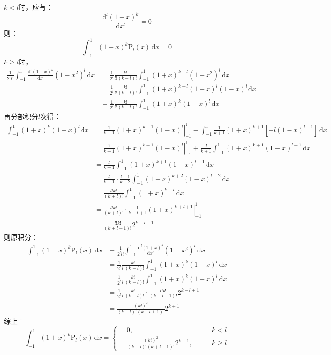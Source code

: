 \documentclass[fontset=windows]{ctexart}
\begin{document}
\begin{itemize}
    $k<l$时，应有：
    \[
        \frac{\mathrm{d}^l(1+x)^k}{\mathrm{d}x^l} = 0
    \]
    则：
    \[
        \int_{-1}^{1}(1+x)^k\mathrm{P}_l(x)\,\mathrm{d}x = 0
    \]
    $k\geqslant l$时，
    \begin{align*}
        \frac{1}{2^l l!}\int_{-1}^{1}\frac{\mathrm{d}^l(1+x)^k}{\mathrm{d}x^l}(1-x^2)^{l}\,\mathrm{d}x
        &= \frac{1}{2^l}\frac{k!}{l!(k-l)!}\int_{-1}^{1}(1+x)^{k-l}(1-x^2)^{l}\,\mathrm{d}x \\
        &= \frac{1}{2^l}\frac{k!}{l!(k-l)!}\int_{-1}^{1}(1+x)^{k-l}(1+x)^{l}(1-x)^{l}\,\mathrm{d}x \\
        &= \frac{1}{2^l}\frac{k!}{l!(k-l)!}\int_{-1}^{1}(1+x)^{k}(1-x)^{l}\,\mathrm{d}x
    \end{align*}
    再分部积分$l$次得：
    \begin{align*}
        \int_{-1}^{1}(1+x)^k(1-x)^{l}\,\mathrm{d}x
        &= \left.\frac{1}{k+1}(1+x)^{k+1}(1-x)^l\right|_{-1}^1 - \int_{-1}^{1}\frac{1}{k+1}(1+x)^{k+1}[-l(1-x)^{l-1}]\,\mathrm{d}x \\
        &= \left.\frac{1}{k+1}(1+x)^{k+1}(1-x)^l\right|_{-1}^1 + \frac{l}{k+1}\int_{-1}^{1}(1+x)^{k+1}(1-x)^{l-1}\,\mathrm{d}x \\
        &= \frac{l}{k+1}\int_{-1}^{1}(1+x)^{k+1}(1-x)^{l-1}\,\mathrm{d}x \\
        &= \frac{l}{k+1}\cdot\frac{l-1}{k+2}\int_{-1}^{1}(1+x)^{k+2}(1-x)^{l-2}\,\mathrm{d}x \\
        &= \frac{l!k!}{(k+l)!}\int_{-1}^{1}(1+x)^{k+l}\,\mathrm{d}x \\
        &= \left.\frac{l!k!}{(k+l)!}\cdot\frac{1}{k+l+1}(1+x)^{k+l+1}\right|_{-1}^{1} \\
        &= \frac{l!k!}{(k+l+1)!}2^{k+l+1}
    \end{align*}
    则原积分：
    \begin{align*}
        \int_{-1}^{1}(1+x)^k\mathrm{P}_l(x)\,\mathrm{d}x
        &= \frac{1}{2^l l!}\int_{-1}^{1}\frac{\mathrm{d}^l(1+x)^k}{\mathrm{d}x^l}(1-x^2)^{l}\,\mathrm{d}x \\
        &= \frac{1}{2^l }\frac{k!}{l!(k-l)!}\int_{-1}^{1}(1+x)^{k}(1-x)^{l}\,\mathrm{d}x \\
        &= \frac{1}{2^l }\frac{k!}{l!(k-l)!}\int_{-1}^{1}(1+x)^{k}(1-x)^{l}\,\mathrm{d}x \\
        &= \frac{1}{2^l}\frac{k!}{l!(k-l)!}\cdot\frac{l!k!}{(k+l+1)!}2^{k+l+1} \\
        &= \frac{(k!)^2}{(k-l)!(k+l+1)!}2^{k+1}
    \end{align*}
    综上：
    \[
    \int_{-1}^{1}(1+x)^k\mathrm{P}_l(x)\,\mathrm{d}x =
    \left\{
    \begin{aligned}
        &\ 0,\qquad &k<l \\
        &\ \frac{(k!)^2}{(k-l)!(k+l+1)!}2^{k+1},\qquad &k\geqslant l
    \end{aligned}
    \right.
    \]
    \bigskip


\end{itemize}
\end{document}
